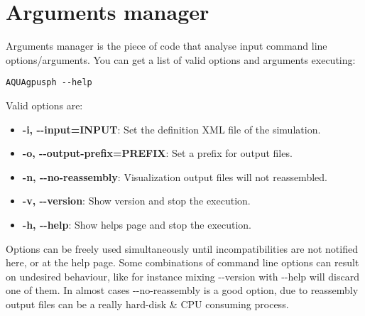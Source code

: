 \section{Arguments manager}
\label{ss:aquagpusph:argmanager}
%
Arguments manager is the piece of code that analyse input command line options/arguments. You can get a
list of valid options and arguments executing:
%
\begin{verbatim}
AQUAgpusph --help
\end{verbatim}
%
Valid options are:
%
\begin{itemize}
	\item \textbf{-i, -\--input=INPUT}: Set the definition XML file of the simulation.
	\item \textbf{-o, -\--output-prefix=PREFIX}: Set a prefix for output files.
	\item \textbf{-n, -\--no-reassembly}: Visualization output files will not reassembled.
	\item \textbf{-v, -\--version}: Show \NAME version and stop the execution.
	\item \textbf{-h, -\--help}: Show \NAME helps page and stop the execution.
\end{itemize}
%
Options can be freely used simultaneously until incompatibilities are not notified here, or at the help
page. Some combinations of command line options can result on undesired behaviour, like for instance
mixing -\--version with -\--help will discard one of them.\rc
%
In almost cases -\--no-reassembly is a good option, due to reassembly output files can be a really
hard-disk \& CPU consuming process.
%
